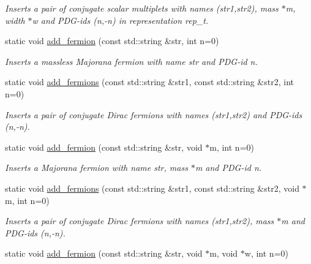 \begin{DoxyCompactItemize}
\begin{DoxyCompactList}\small\item\em Inserts a pair of conjugate scalar multiplets with names (str1,str2), mass $\ast$m, width $\ast$w and P\+D\+G-\/ids (n,-\/n) in representation rep\+\_\+t. \end{DoxyCompactList}\item 
\hypertarget{a00372_a68b370343c09a6e02aee70732eed1242}{}static void \hyperlink{a00372_a68b370343c09a6e02aee70732eed1242}{add\+\_\+fermion} (const std\+::string \&str, int n=0)\label{a00372_a68b370343c09a6e02aee70732eed1242}

\begin{DoxyCompactList}\small\item\em Inserts a massless Majorana fermion with name str and P\+D\+G-\/id n. \end{DoxyCompactList}\item 
static void \hyperlink{a00372_a8d405f13336b9e6b339c62c40b73cd2b}{add\+\_\+fermions} (const std\+::string \&str1, const std\+::string \&str2, int n=0)
\begin{DoxyCompactList}\small\item\em Inserts a pair of conjugate Dirac fermions with names (str1,str2) and P\+D\+G-\/ids (n,-\/n). \end{DoxyCompactList}\item 
\hypertarget{a00372_aef88dbc0a38bbefca4827d67b2244867}{}static void \hyperlink{a00372_aef88dbc0a38bbefca4827d67b2244867}{add\+\_\+fermion} (const std\+::string \&str, void $\ast$m, int n=0)\label{a00372_aef88dbc0a38bbefca4827d67b2244867}

\begin{DoxyCompactList}\small\item\em Inserts a Majorana fermion with name str, mass $\ast$m and P\+D\+G-\/id n. \end{DoxyCompactList}\item 
\hypertarget{a00372_a78aefcded03d37c4267bd6f410199aa9}{}static void \hyperlink{a00372_a78aefcded03d37c4267bd6f410199aa9}{add\+\_\+fermions} (const std\+::string \&str1, const std\+::string \&str2, void $\ast$m, int n=0)\label{a00372_a78aefcded03d37c4267bd6f410199aa9}

\begin{DoxyCompactList}\small\item\em Inserts a pair of conjugate Dirac fermions with names (str1,str2), mass $\ast$m and P\+D\+G-\/ids (n,-\/n). \end{DoxyCompactList}\item 
\hypertarget{a00372_ac93469e0837a782225f2c803e847e290}{}static void \hyperlink{a00372_ac93469e0837a782225f2c803e847e290}{add\+\_\+fermion} (const std\+::string \&str, void $\ast$m, void $\ast$w, int n=0)\label{a00372_ac93469e0837a782225f2c803e847e290}


\end{DoxyCompactItemize}
